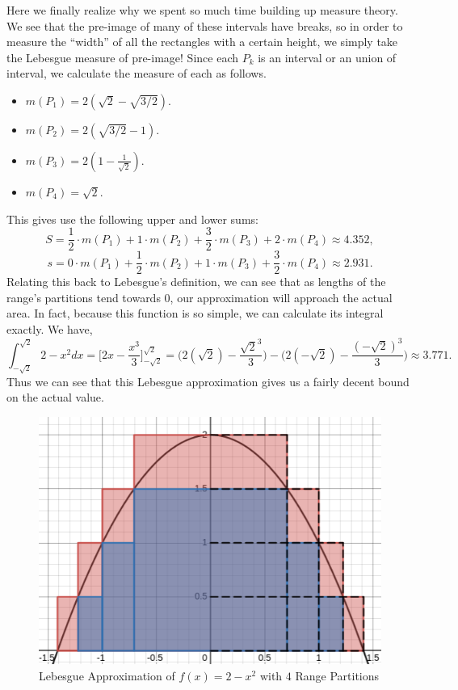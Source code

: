 \documentclass{article}
\theoremstyle{axiom} \newtheorem{axiom}{Axiom}
\theoremstyle{definition} \newtheorem{definition}{Definition}
\theoremstyle{example} \newtheorem{example}{Example}
\theoremstyle{proposition} \newtheorem{prop}{Proposition}
\theoremstyle{lemma} \newtheorem{lemma}{Lemma}
\begin{document}
Here we finally realize why we spent so much time building up measure theory. 
We see that the pre-image of many of these intervals have breaks, so in order to
measure the ``width'' of all the rectangles with a certain height, we simply 
take the Lebesgue measure of pre-image! Since each $P_k$ is an interval or an
union of interval, we calculate the measure of each as follows.
\begin{itemize}
	\item $m(P_1) =  2(\sqrt{2} - \sqrt{3/2})$.
	\item $m(P_2) =  2(\sqrt{3/2} - 1)$.
	\item $m(P_3) =  2(1-\frac{1}{\sqrt{2}})$.
	\item $m(P_4) = \sqrt{2}$.
\end{itemize}
This gives use the following upper and lower sums:
\begin{equation*}
	S = \frac{1}{2}\cdot m(P_1) + 1\cdot m(P_2) + \frac{3}{2}\cdot m(P_3) + 2\cdot m(P_4)
	\approx 4.352,
\end{equation*}
\begin{equation*}
	s = 0\cdot m(P_1) + \frac{1}{2}\cdot m(P_2) + 1\cdot m(P_3) +
	\frac{3}{2}\cdot m(P_4) \approx 2.931.
\end{equation*}
Relating this back to Lebesgue's definition, we can see that as lengths of the 
range's partitions tend towards 0, our approximation will approach the actual area. 
In fact, because this function is so simple, we can calculate its integral
exactly. We have,
\begin{equation*}
	\int^{\sqrt{2}}_{-\sqrt{2}} 2-x^2 dx = 
		\bigg[2x - \frac{x^3}{3} \bigg]^{\sqrt{2}}_{-\sqrt{2}} = 
		\bigg(2(\sqrt{2}) - \frac{\sqrt{2}^3}{3} \bigg) - \bigg( 2(-\sqrt{2}) -
		\frac{(-\sqrt{2})^3}{3} \bigg) \approx 3.771.
\end{equation*}
Thus we can see that this Lebesgue approximation gives us a fairly decent bound on the 
actual value. 

\begin{figure}[H]
	\centering
	\includegraphics[scale=0.4]{img/approx.png}
	\caption{Lebesgue Approximation of $f(x) = 2-x^2$ with $4$ Range Partitions}
\end{figure}
\end{document}
